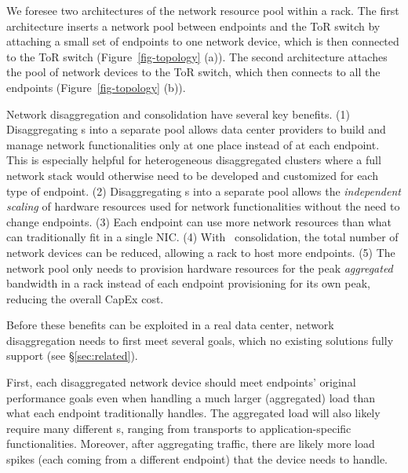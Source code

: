 We foresee two architectures of the network resource pool within a rack. The first architecture inserts a network pool between endpoints and the ToR switch by attaching a small set of endpoints to one network device, which is then connected to the ToR switch (Figure~\ref{fig-topology} (a)). The second architecture attaches the pool of network devices to the ToR switch, which then connects to all the endpoints (Figure~\ref{fig-topology} (b)). 

Network disaggregation and consolidation have several key benefits.
(1) Disaggregating \nt{}s into a separate pool allows data center providers to build and manage network functionalities only at one place instead of at each endpoint. 
This is especially helpful for heterogeneous disaggregated clusters where a full network stack would otherwise need to be developed and customized for each type of endpoint.
(2) Disaggregating \nt{}s into a separate pool allows the {\em independent scaling} of hardware resources used for network functionalities without the need to change endpoints.
(3) Each endpoint can use more network resources than what can traditionally fit in a single NIC. 
(4) With \nt\ consolidation, the total number of network devices can be reduced, allowing a rack to host more endpoints.
(5) The network pool only needs to provision hardware resources for the peak \textit{aggregated} bandwidth in a rack instead of each endpoint provisioning for its own peak, reducing the overall CapEx cost.

Before these benefits can be exploited in a real data center, network disaggregation needs to first meet several goals, which no existing solutions fully support (see \S\ref{sec:related}).



First, each disaggregated network device should meet endpoints' original performance goals even when handling a much larger (aggregated) load than what each endpoint traditionally handles.
The aggregated load will also likely require many different \nt{}s, ranging from transports to application-specific functionalities.
Moreover, after aggregating traffic, there are likely more load spikes (each coming from a different endpoint) that the device needs to handle.

